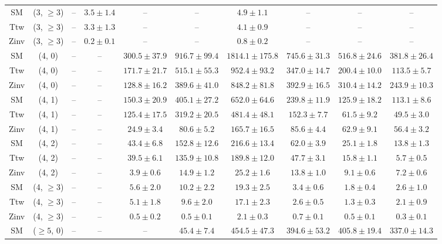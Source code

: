 \begin{table}[h!]
{\begin{tabular}{cccccccccc}
	SM & (3, $\ge3$) & -- & $3.5\pm 1.4$ & -- & -- & $4.9\pm 1.1$ & -- & -- & -- \\[0.5ex] 
	Ttw & (3, $\ge3$) & -- & $3.3\pm 1.3$ & -- & -- & $4.1\pm 0.9$ & -- & -- & -- \\[0.5ex] 
	Zinv & (3, $\ge3$) & -- & $0.2\pm 0.1$ & -- & -- & $0.8\pm 0.2$ & -- & -- & -- \\[0.5ex] 
	SM & (4, 0) & -- & -- & $300.5\pm 37.9$ & $916.7\pm 99.4$ & $1814.1\pm 175.8$ & $745.6\pm 31.3$ & $516.8\pm 24.6$ & $381.8\pm 26.4$ \\[0.5ex] 
	Ttw & (4, 0) & -- & -- & $171.7\pm 21.7$ & $515.1\pm 55.3$ & $952.4\pm 93.2$ & $347.0\pm 14.7$ & $200.4\pm 10.0$ & $113.5\pm 5.7$ \\[0.5ex] 
	Zinv & (4, 0) & -- & -- & $128.8\pm 16.2$ & $389.6\pm 41.0$ & $848.2\pm 81.8$ & $392.9\pm 16.5$ & $310.4\pm 14.2$ & $243.9\pm 10.3$ \\[0.5ex] 
	SM & (4, 1) & -- & -- & $150.3\pm 20.9$ & $405.1\pm 27.2$ & $652.0\pm 64.6$ & $239.8\pm 11.9$ & $125.9\pm 18.2$ & $113.1\pm 8.6$ \\[0.5ex] 
	Ttw & (4, 1) & -- & -- & $125.4\pm 17.5$ & $319.2\pm 20.5$ & $481.4\pm 48.1$ & $152.3\pm 7.7$ & $61.5\pm 9.2$ & $49.5\pm 3.0$ \\[0.5ex] 
	Zinv & (4, 1) & -- & -- & $24.9\pm 3.4$ & $80.6\pm 5.2$ & $165.7\pm 16.5$ & $85.6\pm 4.4$ & $62.9\pm 9.1$ & $56.4\pm 3.2$ \\[0.5ex] 
	SM & (4, 2) & -- & -- & $43.4\pm 6.8$ & $152.8\pm 12.6$ & $216.6\pm 13.4$ & $62.0\pm 3.9$ & $25.1\pm 1.8$ & $13.8\pm 1.3$ \\[0.5ex] 
	Ttw & (4, 2) & -- & -- & $39.5\pm 6.1$ & $135.9\pm 10.8$ & $189.8\pm 12.0$ & $47.7\pm 3.1$ & $15.8\pm 1.1$ & $5.7\pm 0.5$ \\[0.5ex] 
	Zinv & (4, 2) & -- & -- & $3.9\pm 0.6$ & $14.9\pm 1.2$ & $25.2\pm 1.6$ & $13.8\pm 1.0$ & $9.1\pm 0.6$ & $7.2\pm 0.6$ \\[0.5ex] 
	SM & (4, $\ge3$) & -- & -- & $5.6\pm 2.0$ & $10.2\pm 2.2$ & $19.3\pm 2.5$ & $3.4\pm 0.6$ & $1.8\pm 0.4$ & $2.6\pm 1.0$ \\[0.5ex] 
	Ttw & (4, $\ge3$) & -- & -- & $5.1\pm 1.8$ & $9.6\pm 2.0$ & $17.1\pm 2.3$ & $2.6\pm 0.5$ & $1.3\pm 0.3$ & $2.1\pm 0.9$ \\[0.5ex] 
	Zinv & (4, $\ge3$) & -- & -- & $0.5\pm 0.2$ & $0.5\pm 0.1$ & $2.1\pm 0.3$ & $0.7\pm 0.1$ & $0.5\pm 0.1$ & $0.3\pm 0.1$ \\[0.5ex] 
	SM & ($\ge5$, 0) & -- & -- & -- & $45.4\pm 7.4$ & $454.5\pm 47.3$ & $394.6\pm 53.2$ & $405.8\pm 19.4$ & $337.0\pm 14.3$ \\[0.5ex] 

\end{tabular}}
\end{table}
